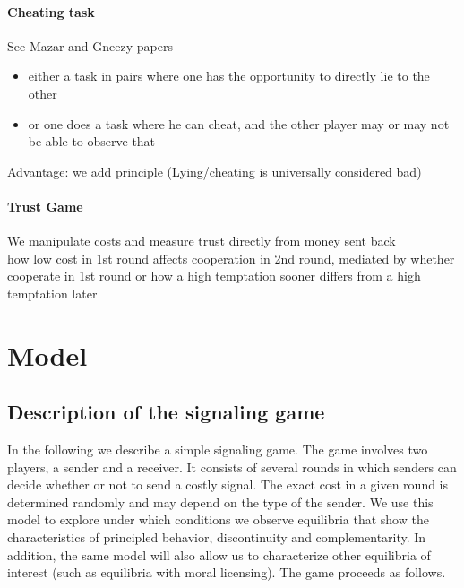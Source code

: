 \documentclass[11pt]{article}
\theoremstyle{plainCl1}
\begin{document}
\paragraph{Cheating task}

See Mazar and Gneezy papers\

\begin{itemize}
    \item either a task in pairs where one has the opportunity to directly lie to the other
    \item or one does a task where he can cheat, and the other player may or may not be able to observe that
\end{itemize}
Advantage: we add principle (Lying/cheating is universally considered bad)\\

\paragraph{Trust Game}

We manipulate costs and measure trust directly from money sent back\\
how low cost in 1st round affects cooperation in 2nd round, mediated by whether cooperate in 1st round
or how a high temptation sooner differs from a high temptation later




\section{Model}

\subsection{Description of the signaling game}


In the following we describe a simple signaling game. The game involves two players, a sender and a receiver. It consists of several rounds in which senders can decide whether or not to send a costly signal. The exact cost in a given round is determined randomly and may depend on the type of the sender. We use this model to explore under which conditions we observe equilibria that show the characteristics of principled behavior, discontinuity and complementarity. In addition, the same model will also allow us to characterize other equilibria of interest (such as equilibria with moral licensing).
The game proceeds as follows. 
\end{document}
